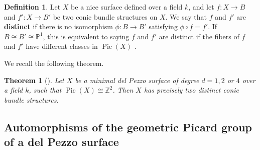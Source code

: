 \documentclass[a4paper, 11pt, reqno]{amsart}
\numberwithin{equation}{section} \numberwithin{figure}{section}
\newcommand{\term}[1]{\textbf{#1}}          %
\DeclareMathOperator{\Pic}{Pic}
\def \P {{\mathbb P}}
\def \Z {{\mathbb Z}}
\newcommand{\ra}{\rightarrow}
\newtheorem{theorem}[lemma]{Theorem}
\newtheorem{proposition}[lemma]{Proposition}
\theoremstyle{definition}
\newtheorem{definition}[lemma]{Definition}
\numberwithin{lemma}{section}
\begin{document}

\begin{definition}
    Let $X$ be a nice surface defined over a field $k$, and let $f \colon X \ra B$ and $f' \colon X \ra B'$ be two conic bundle structures on $X$. We say that $f$ and $f'$ are \term{distinct} if there is no isomorphism $\phi \colon B \ra B'$ satisfying $\phi \circ f = f'$. If $B \cong B' \cong \P^1$, this is equivalent to saying $f$ and $f'$ are distinct if the fibers of ${f}$ and $f'$ have different classes in $\Pic(X)$ \cite[II, Theorem 7.1, Example 7.1.1]{hartshorne}.
\end{definition}


We recall the following theorem.

\begin{theorem}[{\cite[Theorem 5]{iskovskih}}]\label{thm:twoconicbundles}
    Let $X$ be a minimal del Pezzo surface of degree $d = 1, 2$ or $4$ over a field $k$, such that $\Pic(X) \cong \Z^2$. Then $X$ has precisely two distinct conic bundle structures.
\end{theorem}

\subsection{Automorphisms of the geometric Picard group of a del Pezzo surface}\label{sec:autpicdelPezzo}
\end{document}

